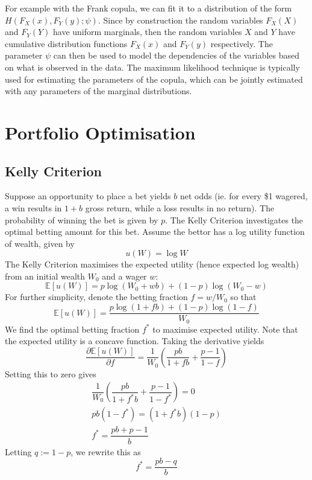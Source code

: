 \documentclass[11pt]{report} %
\begin{document}
For example with the Frank copula, we can fit it to a distribution of the form $H\left(F_{X}\left(x\right), F_{Y}\left(y\right); \psi\right)$. Since by construction the random variables $F_{X}\left(X\right)$ and $F_{Y}\left(Y\right)$ have uniform marginals, then the random variables $X$ and $Y$ have cumulative distribution functions $F_{X}\left(x\right)$ and $F_{Y}\left(y\right)$ respectively. The parameter $\psi$ can then be used to model the dependencies of the variables based on what is observed in the data. The maximum likelihood technique is typically used for estimating the parameters of the copula, which can be jointly estimated with any parameters of the marginal distributions.

\section{Portfolio Optimisation}

\subsection{Kelly Criterion}

Suppose an opportunity to place a bet yields $b$ net odds (ie. for every \$1 wagered, a win results in $1 + b$ gross return, while a loss results in no return). The probability of winning the bet is given by $p$. The Kelly Criterion investigates the optimal betting amount for this bet. Assume the bettor has a log utility function of wealth, given by
\begin{equation}
u\left(W\right) = \log W
\end{equation}
The Kelly Criterion maximises the expected utility (hence expected log wealth) from an initial wealth $W_{0}$ and a wager $w$:
\begin{equation}
\mathbb{E}\left[u\left(W\right)\right] = p\log\left(W_{0} + wb\right) + \left(1 - p\right)\log\left(W_{0} - w\right)
\end{equation}
For further simplicity, denote the betting fraction $f = w/W_{0}$ so that
\begin{equation}
\mathbb{E}\left[u\left(W\right)\right] = \dfrac{p\log\left(1 + fb\right) + \left(1 - p\right)\log\left(1 - f\right)}{W_{0}}
\end{equation}
We find the optimal betting fraction $f^{*}$ to maximise expected utility. Note that the expected utility is a concave function. Taking the derivative yields
\begin{equation}
\dfrac{\partial \mathbb{E}\left[u\left(W\right)\right]}{\partial f} = \dfrac{1}{W_{0}}\left(\dfrac{pb}{1 + fb} + \dfrac{p - 1}{1 - f}\right)
\end{equation}
Setting this to zero gives
\begin{gather}
\dfrac{1}{W_{0}}\left(\dfrac{pb}{1 + f^{*}b} + \dfrac{p - 1}{1 - f^{*}}\right) = 0 \\
pb\left(1 - f^{*}\right) = \left(1 + f^{*}b\right)\left(1 - p\right) \\
f^{*} = \dfrac{pb + p - 1}{b}
\end{gather}
Letting $q := 1 - p$, we rewrite this as
\begin{equation}
f^{*} = \dfrac{pb - q}{b}
\end{equation}
\end{document}
